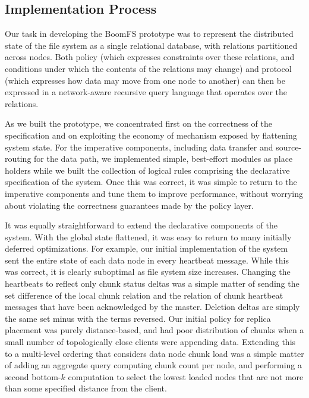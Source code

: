 \documentclass[twocolumn]{article}
\begin{document}
\subsection{Implementation Process}
\label{decl-approach}
Our task in developing the BoomFS prototype was to represent the
distributed state of the file system as a single relational database,
with relations partitioned across nodes.  Both policy (which expresses
constraints over these relations, and conditions under which the
contents of the relations may change) and protocol (which expresses
how data may move from one node to another) can then be expressed in a
network-aware recursive query language that operates over the
relations.

As we built the prototype, we concentrated first on the correctness of
the specification and on exploiting the economy of mechanism exposed
by flattening system state.  For the imperative components, including
data transfer and source-routing for the data path, we implemented
simple, best-effort modules as place holders while we built the
collection of logical rules comprising the declarative specification
of the system.  Once this was correct, it was simple to return to the
imperative components and tune them to improve performance, without
worrying about violating the correctness guarantees made by the policy
layer.

It was equally straightforward to extend the declarative components of
the system.  With the global state flattened, it was easy to return to
many initially deferred optimizations.  For example, our initial
implementation of the system sent the entire state of each data node
in every heartbeat message. While this was correct, it is clearly
suboptimal as file system size increases.  Changing the heartbeats to
reflect only chunk status deltas was a simple matter of sending the
set difference of the local chunk relation and the relation of chunk
heartbeat messages that have been acknowledged by the master.
Deletion deltas are simply the same set minus with the terms reversed.
Our initial policy for replica placement was purely distance-based,
and had poor distribution of chunks when a small number of
topologically close clients were appending data.  Extending this to a
multi-level ordering that considers data node chunk load was a simple
matter of adding an aggregate query computing chunk count per node,
and performing a second bottom-$k$ computation to select the lowest
loaded nodes that are not more than some specified distance from the
client.
\end{document}
